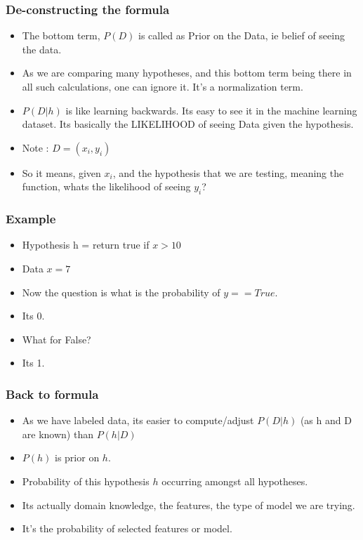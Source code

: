 \begin{frame}[fragile]\frametitle{De-constructing the formula}

\begin{itemize}
\item The bottom term, $P(D)$ is called as Prior on the Data, ie belief of seeing the data. 
\item As we are comparing many hypotheses, and this bottom term being there in all such calculations, one can ignore it. It’s a normalization term.
\item $P(D|h)$ is like learning backwards. Its easy to see it in the machine learning dataset. Its basically the LIKELIHOOD of seeing Data given the hypothesis.
\item Note : $D = {(x_i, y_i)}$
\item So it means, given $x_i$, and the hypothesis that we are testing, meaning the function, whats the likelihood of seeing $y_i$?

\end{itemize}

\end{frame}

\begin{frame}[fragile]\frametitle{Example}

\begin{itemize}
\item Hypothesis h = return true if $x > 10$
\item Data $x = 7$
\item Now the question is what is the probability of $y == True$. 
\item Its 0. 
\item What for False? 
\item Its 1.


\end{itemize}

\end{frame}

\begin{frame}[fragile]\frametitle{Back to formula}

\begin{itemize}
\item As we have labeled data, its easier to compute/adjust $P(D|h)$ (as h and D are known) than $P(h|D)$
\item $P(h)$ is prior on $h$. 
\item Probability of this hypothesis $h$ occurring amongst all hypotheses. 
\item Its actually domain knowledge, the features, the type of model we are trying. 
\item It’s the probability of selected features or model.
\end{itemize}

\end{frame}



